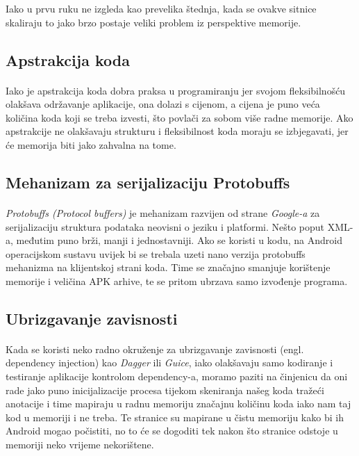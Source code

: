 \documentclass[times, utf8, zavrsni]{fer}
\begin{document}
Iako u prvu ruku ne izgleda kao prevelika štednja, kada se ovakve sitnice  skaliraju to jako brzo postaje veliki problem iz perspektive memorije.

\subsection{Apstrakcija koda}
\paragraph{}
Iako je apstrakcija koda dobra praksa u programiranju jer svojom fleksibilnošću olakšava održavanje aplikacije, ona dolazi s cijenom, a cijena je puno veća količina koda koji se treba izvesti, što povlači za sobom više radne memorije. Ako apstrakcije ne olakšavaju strukturu i fleksibilnost koda moraju se izbjegavati, jer će memorija biti jako zahvalna na tome.

\subsection{Mehanizam za serijalizaciju Protobuffs}
\paragraph{}
\textit{Protobuffs (Protocol buffers)} je mehanizam razvijen od strane \textit{Google-a} za serijalizaciju struktura podataka neovisni o jeziku i platformi. Nešto poput XML-a, međutim puno brži, manji i jednostavniji. Ako se koristi u kodu, na Android operacijskom sustavu uvijek bi se trebala uzeti nano verzija protobuffs mehanizma na klijentskoj strani koda. Time se značajno smanjuje korištenje memorije i veličina APK arhive, te se pritom ubrzava samo izvođenje programa.

\subsection{Ubrizgavanje zavisnosti}
\paragraph{}
Kada se koristi neko radno okruženje za ubrizgavanje zavisnosti (engl. dependency injection) kao \textit{Dagger} ili \textit{Guice}, iako olakšavaju samo kodiranje i testiranje aplikacije kontrolom dependency-a, moramo paziti na činjenicu da oni rade jako puno inicijalizacije procesa tijekom skeniranja našeg koda tražeći anotacije i time mapiraju u radnu memoriju značajnu količinu koda iako nam taj kod u memoriji i ne treba. Te stranice su mapirane u čistu memoriju kako bi ih Android mogao počistiti, no to će se dogoditi tek nakon što stranice odstoje u memoriji neko vrijeme nekorištene.
\end{document}
